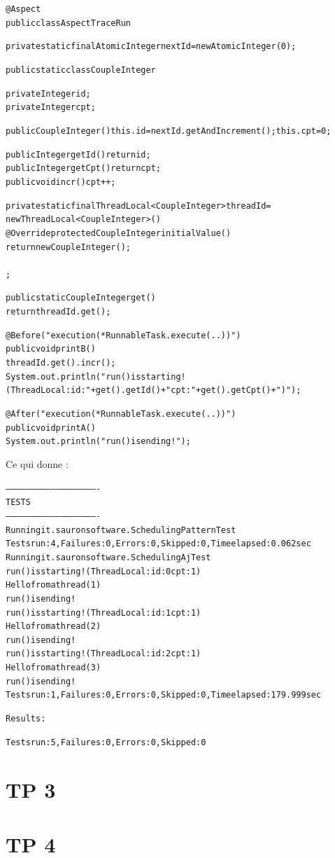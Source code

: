 \documentclass{article}
\begin{document}
\begin{alltt}
@Aspect
    public class AspectTraceRun {

    private static final AtomicInteger nextId = new AtomicInteger(0);

    public static class CoupleInteger {
     	private Integer id;
	private Integer cpt;
	
	public CoupleInteger (){ this.id=nextId.getAndIncrement(); this.cpt=0;}
	
	public Integer getId () { return id; }
	public Integer getCpt () { return cpt; }
        public void incr () { cpt++; }
    }

    private static final ThreadLocal<CoupleInteger> threadId =
	new ThreadLocal<CoupleInteger>() {
	@Override protected CoupleInteger initialValue() {
	    return new CoupleInteger();
	}
    };

    public static CoupleInteger get() {
	return threadId.get();
    }

    @Before("execution(* RunnableTask.execute(..))")
	public void printB () { 
        threadId.get().incr();
	System.out.println("run() is starting! (ThreadLocal: id:"+get().getId()+" cpt: "+get().getCpt()+")");
    }

    @After("execution(* RunnableTask.execute(..))")
	public void printA () { 
	System.out.println("run() is ending!");
    }
}
\end{alltt}

Ce qui donne : 

\begin{alltt}

-------------------------------------------------------
 T E S T S
-------------------------------------------------------
Running it.sauronsoftware.SchedulingPatternTest
Tests run: 4, Failures: 0, Errors: 0, Skipped: 0, Time elapsed: 0.062 sec
Running it.sauronsoftware.SchedulingAjTest
run() is starting! (ThreadLocal: id:0 cpt: 1)
Hello from a thread (1)
run() is ending!
run() is starting! (ThreadLocal: id:1 cpt: 1)
Hello from a thread (2)
run() is ending!
run() is starting! (ThreadLocal: id:2 cpt: 1)
Hello from a thread (3)
run() is ending!
Tests run: 1, Failures: 0, Errors: 0, Skipped: 0, Time elapsed: 179.999 sec

Results :

Tests run: 5, Failures: 0, Errors: 0, Skipped: 0
\end{alltt}

\section{TP 3}

\section{TP 4}
\end{document}
